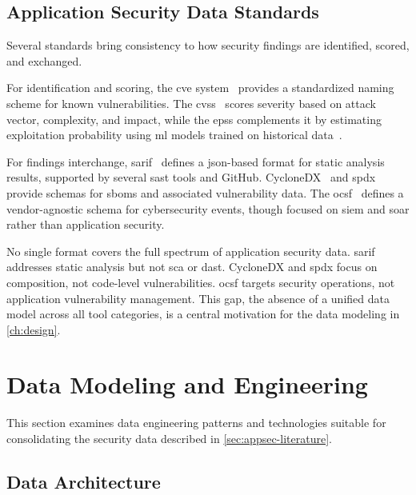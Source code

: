 \subsection{Application Security Data Standards}
\label{sec:data-standards}

Several standards bring consistency to how security findings are identified, scored, and exchanged.

For identification and scoring, the \gls{cve} system~\parencite{MITRE2024} provides a standardized naming scheme for known vulnerabilities. The \gls{cvss}~\parencite{FIRST2019} scores severity based on attack vector, complexity, and impact, while the \gls{epss} complements it by estimating exploitation probability using \gls{ml} models trained on historical data~\parencite{Jacobs2021}.

For findings interchange, \gls{sarif}~\parencite{OASIS2024} defines a \gls{json}-based format for static analysis results, supported by several \gls{sast} tools and GitHub. CycloneDX~\parencite{CycloneDX2024} and \gls{spdx}~\parencite{SPDX2024} provide schemas for \glspl{sbom} and associated vulnerability data. The \gls{ocsf}~\parencite{OCSF2024} defines a vendor-agnostic schema for cybersecurity events, though focused on \gls{siem} and \gls{soar} rather than application security.

No single format covers the full spectrum of application security data. \gls{sarif} addresses static analysis but not \gls{sca} or \gls{dast}. CycloneDX and \gls{spdx} focus on composition, not code-level vulnerabilities. \gls{ocsf} targets security operations, not application vulnerability management. This gap, the absence of a unified data model across all tool categories, is a central motivation for the data modeling in \autoref{ch:design}.


\section{Data Modeling and Engineering}
\label{sec:data-literature}

This section examines data engineering patterns and technologies suitable for consolidating the security data described in \autoref{sec:appsec-literature}.

\subsection{Data Architecture}
\label{sec:data-architecture}


